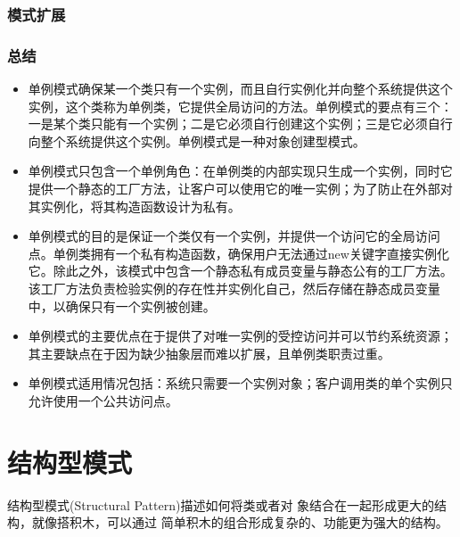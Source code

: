 \documentclass[letterpaper,10pt,english]{sphinxmanual}
\begin{document}
\subsection{模式扩展}
\label{\detokenize{creational_patterns/singleton:id14}}

\subsection{总结}
\label{\detokenize{creational_patterns/singleton:id15}}\begin{itemize}
\item {} 
\sphinxAtStartPar
单例模式确保某一个类只有一个实例，而且自行实例化并向整个系统提供这个实例，这个类称为单例类，它提供全局访问的方法。单例模式的要点有三个：一是某个类只能有一个实例；二是它必须自行创建这个实例；三是它必须自行向整个系统提供这个实例。单例模式是一种对象创建型模式。

\item {} 
\sphinxAtStartPar
单例模式只包含一个单例角色：在单例类的内部实现只生成一个实例，同时它提供一个静态的工厂方法，让客户可以使用它的唯一实例；为了防止在外部对其实例化，将其构造函数设计为私有。

\item {} 
\sphinxAtStartPar
单例模式的目的是保证一个类仅有一个实例，并提供一个访问它的全局访问点。单例类拥有一个私有构造函数，确保用户无法通过new关键字直接实例化它。除此之外，该模式中包含一个静态私有成员变量与静态公有的工厂方法。该工厂方法负责检验实例的存在性并实例化自己，然后存储在静态成员变量中，以确保只有一个实例被创建。

\item {} 
\sphinxAtStartPar
单例模式的主要优点在于提供了对唯一实例的受控访问并可以节约系统资源；其主要缺点在于因为缺少抽象层而难以扩展，且单例类职责过重。

\item {} 
\sphinxAtStartPar
单例模式适用情况包括：系统只需要一个实例对象；客户调用类的单个实例只允许使用一个公共访问点。

\end{itemize}

\sphinxstepscope


\chapter{结构型模式}
\label{\detokenize{structural_patterns/structural:structural}}\label{\detokenize{structural_patterns/structural:id1}}\label{\detokenize{structural_patterns/structural::doc}}
\sphinxAtStartPar
结构型模式(Structural Pattern)描述如何将类或者对
象结合在一起形成更大的结构，就像搭积木，可以通过
简单积木的组合形成复杂的、功能更为强大的结构。
\end{document}
